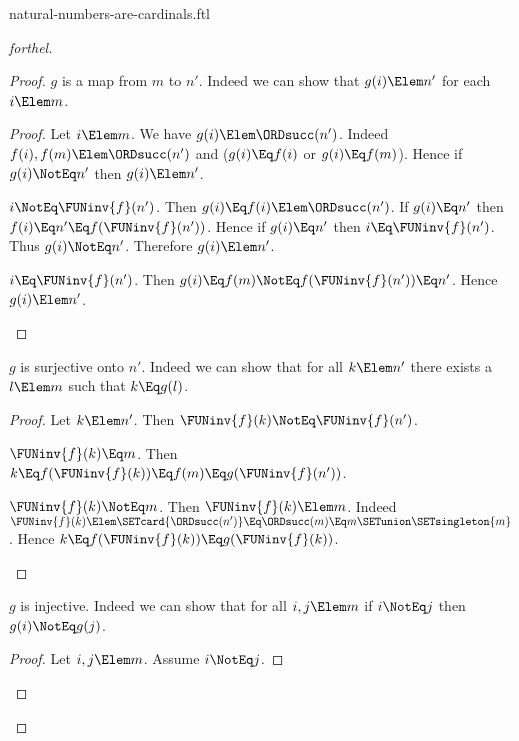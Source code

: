 \documentclass{stex}
\begin{document}
\begin{smodule}{natural-numbers-are-cardinals.ftl}
\begin{proof}[forthel]
\begin{proof}
      $g$ is a map from $m$ to $n'$.
      Indeed we can show that $g(i) \Elem n'$ for each $i \Elem m$.
      \begin{proof}
        Let $i \Elem m$.
        We have $g(i) \Elem \ORDsucc(n')$.
        Indeed $f(i), f(m) \Elem \ORDsucc(n')$ and ($g(i) \Eq f(i)$ or $g(i) \Eq f(m)$).
        Hence if $g(i) \NotEq n'$ then $g(i) \Elem n'$.

        \begin{case}{$i \NotEq \FUNinv{f}(n')$.}
          Then $g(i) \Eq f(i) \Elem \ORDsucc(n')$.
          If $g(i) \Eq n'$ then $f(i) \Eq n' \Eq f(\FUNinv{f}(n'))$.
          Hence if $g(i) \Eq n'$ then $i \Eq \FUNinv{f}(n')$.
          Thus $g(i) \NotEq n'$.
          Therefore $g(i) \Elem n'$.
        \end{case}

        \begin{case}{$i \Eq \FUNinv{f}(n')$.}
          Then $g(i)
            \Eq f(m)
            \NotEq f(\FUNinv{f}(n'))
            \Eq n'$.
          Hence $g(i) \Elem n'$.
        \end{case}
      \end{proof}

      $g$ is surjective onto $n'$.
      Indeed we can show that for all $k \Elem n'$ there exists a $l \Elem m$ such that $k \Eq g(l)$.
      \begin{proof}
        Let $k \Elem n'$.
        Then $\FUNinv{f}(k) \NotEq \FUNinv{f}(n')$.

        \begin{case}{$\FUNinv{f}(k) \Eq m$.}
          Then $k
            \Eq f(\FUNinv{f}(k))
            \Eq f(m)
            \Eq g(\FUNinv{f}(n'))$.
        \end{case}

        \begin{case}{$\FUNinv{f}(k) \NotEq m$.}
          Then $\FUNinv{f}(k) \Elem m$.
          Indeed $\FUNinv{f}(k) \Elem \SETcard{\ORDsucc(n')} \Eq \ORDsucc(m) \Eq m \SETunion \SETsingleton{m}$.
          Hence $k
            \Eq f(\FUNinv{f}(k))
            \Eq g(\FUNinv{f}(k))$.
        \end{case}
      \end{proof}

      $g$ is injective.
      Indeed we can show that for all $i, j \Elem m$ if $i \NotEq j$ then $g(i) \NotEq g(j)$.
      \begin{proof}
        Let $i, j \Elem m$.
        Assume $i \NotEq j$.


\end{proof}
\end{proof}
\end{proof}
\end{smodule}
\end{document}
